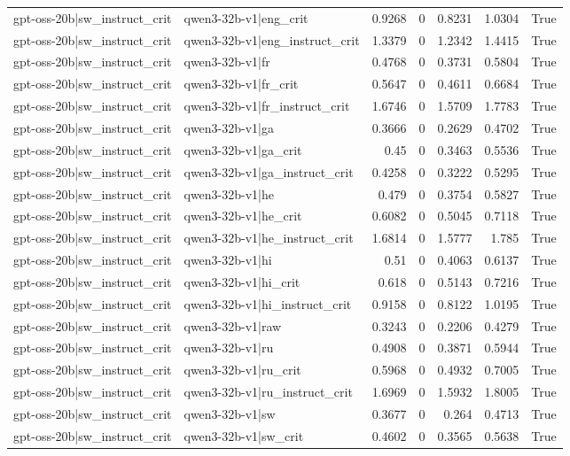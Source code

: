 \begin{table}
\begin{tabular}{l l r r r r l}
gpt-oss-20b|sw_instruct_crit & qwen3-32b-v1|eng_crit & 0.9268 & 0 & 0.8231 & 1.0304 & True \\
gpt-oss-20b|sw_instruct_crit & qwen3-32b-v1|eng_instruct_crit & 1.3379 & 0 & 1.2342 & 1.4415 & True \\
gpt-oss-20b|sw_instruct_crit & qwen3-32b-v1|fr & 0.4768 & 0 & 0.3731 & 0.5804 & True \\
gpt-oss-20b|sw_instruct_crit & qwen3-32b-v1|fr_crit & 0.5647 & 0 & 0.4611 & 0.6684 & True \\
gpt-oss-20b|sw_instruct_crit & qwen3-32b-v1|fr_instruct_crit & 1.6746 & 0 & 1.5709 & 1.7783 & True \\
gpt-oss-20b|sw_instruct_crit & qwen3-32b-v1|ga & 0.3666 & 0 & 0.2629 & 0.4702 & True \\
gpt-oss-20b|sw_instruct_crit & qwen3-32b-v1|ga_crit & 0.45 & 0 & 0.3463 & 0.5536 & True \\
gpt-oss-20b|sw_instruct_crit & qwen3-32b-v1|ga_instruct_crit & 0.4258 & 0 & 0.3222 & 0.5295 & True \\
gpt-oss-20b|sw_instruct_crit & qwen3-32b-v1|he & 0.479 & 0 & 0.3754 & 0.5827 & True \\
gpt-oss-20b|sw_instruct_crit & qwen3-32b-v1|he_crit & 0.6082 & 0 & 0.5045 & 0.7118 & True \\
gpt-oss-20b|sw_instruct_crit & qwen3-32b-v1|he_instruct_crit & 1.6814 & 0 & 1.5777 & 1.785 & True \\
gpt-oss-20b|sw_instruct_crit & qwen3-32b-v1|hi & 0.51 & 0 & 0.4063 & 0.6137 & True \\
gpt-oss-20b|sw_instruct_crit & qwen3-32b-v1|hi_crit & 0.618 & 0 & 0.5143 & 0.7216 & True \\
gpt-oss-20b|sw_instruct_crit & qwen3-32b-v1|hi_instruct_crit & 0.9158 & 0 & 0.8122 & 1.0195 & True \\
gpt-oss-20b|sw_instruct_crit & qwen3-32b-v1|raw & 0.3243 & 0 & 0.2206 & 0.4279 & True \\
gpt-oss-20b|sw_instruct_crit & qwen3-32b-v1|ru & 0.4908 & 0 & 0.3871 & 0.5944 & True \\
gpt-oss-20b|sw_instruct_crit & qwen3-32b-v1|ru_crit & 0.5968 & 0 & 0.4932 & 0.7005 & True \\
gpt-oss-20b|sw_instruct_crit & qwen3-32b-v1|ru_instruct_crit & 1.6969 & 0 & 1.5932 & 1.8005 & True \\
gpt-oss-20b|sw_instruct_crit & qwen3-32b-v1|sw & 0.3677 & 0 & 0.264 & 0.4713 & True \\
gpt-oss-20b|sw_instruct_crit & qwen3-32b-v1|sw_crit & 0.4602 & 0 & 0.3565 & 0.5638 & True \\

\end{tabular}
\end{table}
